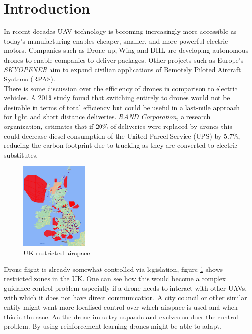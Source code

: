 \section{Introduction}
In recent decades UAV technology is becoming increasingly more accessible as today’s manufacturing enables cheaper, smaller, and more powerful electric motors. Companies such as Drone up\cite{com1}, Wing\cite{com2} and DHL\cite{com3} are developing autonomous drones to enable companies to deliver packages. Other projects such as Europe's \emph{SKYOPENER} \cite{com4} aim to expand civilian applications of Remotely Piloted Aircraft Systems (RPAS).\\
There is some discussion over the efficiency of drones in comparison to electric vehicles. A 2019 study \cite{eff1} found that switching entirely to drones would not be desirable in terms of total efficiency but could be useful in a last-mile approach for light and short distance deliveries. \emph{RAND Corporation}, a research organization,\cite{eff2} estimates that if 20\% of deliveries were replaced by drones this could decrease diesel consumption of the United Parcel Service (UPS) by 5.7\%, reducing the carbon footprint due to trucking as they are converted to electric substitutes.

\vspace{0.5cm}
\begin{figure}
\centering
    \includegraphics[width=0.3\textwidth]{figures/NoFly.jpg}\hfill
    \caption{UK restricted airspace}
    \label{fig:nofly}
\end{figure}

Drone flight is already somewhat controlled via legislation, figure \ref{fig:nofly} shows restricted zones in the UK\cite{res1}. One can see how this would become a complex guidance control problem especially if a drone needs to interact with other UAVs, with which it does not have direct communication.   A city council or other similar entity might want more localised control over which airspace is used and when this is the case. As the drone industry expands and evolves so does the control problem. By using reinforcement learning drones might be able to adapt. 

